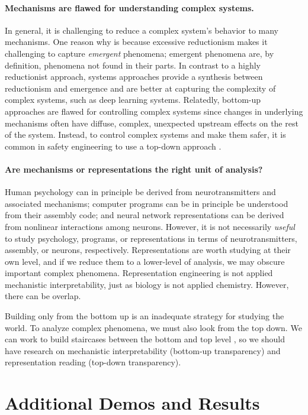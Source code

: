 \paragraph{Mechanisms are flawed for understanding complex systems.}
In general, it is challenging to reduce a complex system's behavior to many mechanisms. One reason why is because excessive reductionism makes it challenging to capture \textit{emergent} phenomena; emergent phenomena are, by definition, phenomena not found in their parts. In contrast to a highly reductionist approach, systems approaches provide a synthesis between reductionism and emergence and are better at capturing the complexity of complex systems, such as deep learning systems. Relatedly, bottom-up approaches are flawed for controlling complex systems since changes in underlying mechanisms often have diffuse, complex, unexpected upstream effects on the rest of the system. Instead, to control complex systems and make them safer, it is common in safety engineering to use a top-down approach \citep{Leveson2012EngineeringAS}. 

\paragraph{Are mechanisms or representations the right unit of analysis?}
Human psychology can in principle be derived from neurotransmitters and associated mechanisms; computer programs can be in principle be understood from their assembly code; and neural network representations can be derived from nonlinear interactions among neurons. However, it is not necessarily \emph{useful} to study psychology, programs, or representations in terms of neurotransmitters, assembly, or neurons, respectively. Representations are worth studying at their own level, and if we reduce them to a lower-level of analysis, we may obscure important complex phenomena. %
Representation engineering is not applied mechanistic interpretability, just as biology is not applied chemistry. However, there can be overlap. %

Building only from the bottom up is an inadequate strategy for studying the world. To analyze complex phenomena, we must also look from the top down. We can work to build staircases between the bottom and top level \citep{gell1995quark}, so we should have research on mechanistic interpretability (bottom-up transparency) and representation reading (top-down transparency).


\section{Additional Demos and Results}


